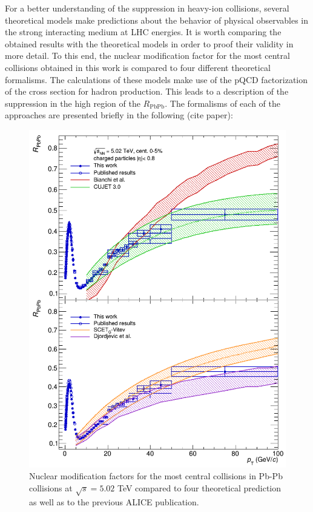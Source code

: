 \documentclass[12pt,a4paper]{report}
\begin{document}
For a better understanding of the suppression in heavy-ion collisions, several theoretical models make predictions about the behavior of physical observables in the strong interacting medium at LHC energies. It is worth comparing the obtained results with the theoretical models in order to proof their validity in more detail. To this end, the nuclear modification factor for the most central collisions obtained in this work is compared to four different theoretical formalisms. The calculations of these models make use of the pQCD factorization of the cross section for hadron production. This leads to a description of the suppression in the high \pt region of the $R_\text{PbPb}$. The formalisms of each of the approaches are presented briefly in the following (cite paper):
\begin{figure}[tb!]
\centering
\includegraphics[width=10	cm]{Plots/Raatheo.png}  
\caption{Nuclear modification factors for the most central collisions in Pb-Pb collisions at $\sqrt{s}=5.02$ TeV compared to four theoretical prediction as well as to the previous ALICE publication.}
\label{raatheo}
\end{figure}
\end{document}
